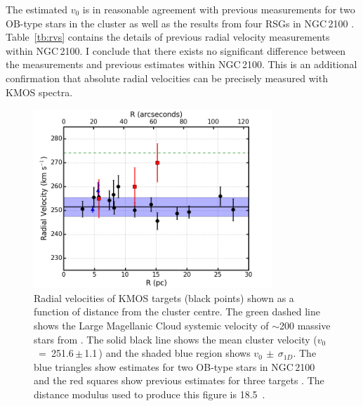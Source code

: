 The estimated $v_0$ is in reasonable agreement with previous measurements for two OB-type stars in the cluster
\citep{2015A&A...584A...5E} as well as the results from four RSGs in NGC\,2100
\citep[henceforth JT94; three of which were observed in the current study]{1994A&A...282..717J}.
Table~\ref{tb:rvs} contains the details of previous radial velocity measurements within NGC\,2100.
I conclude that there exists no significant difference between the measurements and previous estimates within NGC\,2100.
This is an additional confirmation that absolute radial velocities can be precisely measured with KMOS spectra.

\begin{figure}
 \centering
 \includegraphics[width=9.0cm]{ngc2100/NGC2100-rv-v10}
 \caption[KMOS radial velocities in NGC\,2100]{Radial velocities of KMOS targets (black points) shown as a function of distance from the cluster centre.
The green dashed line shows the Large Magellanic Cloud systemic velocity of $\sim$200 massive stars from
 {\protect\citep[274.1\,$\pm$\,16.4\,\kms;][]{2015A&A...584A...5E}}.
 The solid black line shows the mean cluster velocity ($v_0$~=~251.6\,$\pm$\,1.1\,\kms) and the shaded blue region shows $v_0\,\pm\,\sigma_{1D}$.
 The blue triangles show estimates for two OB-type stars in NGC\,2100~\protect\citep{2015A&A...584A...5E} and the red squares show previous estimates for three targets
 {\citep{1994A&A...282..717J}}.
 The distance modulus used to produce this figure is 18.5~\citep{2013Natur.495...76P,2014AJ....147..122D}.
 \label{fig:rvs}}
\end{figure}

